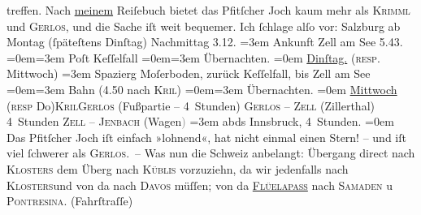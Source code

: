 \begin{ledgroupsized}[t]{13cm}
               treffen.\pend
           \pstart
           Nach \uline{meinem} Reiſebuch bietet das Pfitſcher Joch kaum mehr als \textsc{Krimml} und \textsc{Gerlos}, und die Sache iſt weit bequemer.\pend
           \pstart
           Ich ſchlage alſo vor:\pend
           \pstart
           Salzburg ab Montag (ſpäteſtens
                  Dinſtag) Nachmittag 3.12.\pend
           \leftskip=3em{}\pstart
           \noindent{}{\pb}Ankunft Zell am See{ }5.43.\pend
           \leftskip=0em{}\leftskip=3em{}\pstart
           Poſt Keſſelfall\pend
           \leftskip=0em{}\leftskip=3em{}\pstart
           Übernachten.\pend
           \leftskip=0em{}\pstart
           \noindent{}\uline{Dinſtag.} (\textsc{resp}. Mittwoch)\pend
           \leftskip=3em{}\pstart
           \noindent{}Spazierg Moſerboden, zurück Keſſelfall, bis Zell
                  am See\pend
           \leftskip=0em{}\leftskip=3em{}\pstart
           Bahn (4.50 nach \textsc{Kri{\geminationm}l})\pend
           \leftskip=0em{}\leftskip=3em{}\pstart
           Übernachten.\pend
           \leftskip=0em{}\pstart
           \noindent{}\uline{Mittwoch}{ }\introOben{}(\textsc{resp}{ }Do{\geminationn})\introOben{}{ }\textsc{Kri{\geminationm}l}\textsc{Gerlos} (Fußpartie – 4 Stunden)\pend
           \pstart
           \textsc{Gerlos} – \textsc{Zell} (Zillerthal) 4 Stunden\pend
           \pstart
           \textsc{Zell – Jenbach} (Wagen\textcolor{gray}{)}\pend
           \leftskip=3em{}\pstart
           \noindent{}abds{ }Innsbruck, 4 Stunden.\pend
           \leftskip=0em{}\pstart
           \noindent{}{\pb}Das Pfitſcher
                  Joch iſt einfach »lohnend«, hat nicht einmal einen Stern! – und iſt
               viel ſchwerer als \textsc{Gerlos}. –\pend
           \pstart
           Was nun die Schweiz anbelangt: Übergang direct
               nach \textsc{Klosters} dem Überg nach \textsc{Küblis} vorzuziehn, da wir jedenfalls nach \textsc{Klosters}und von da nach \textsc{Davos} müſſen; von da \textsc{\uline{Flüelapass}} nach \textsc{Samaden} u \textsc{Pontresina}. (Fahrſtraſſe)\pend

\end{ledgroupsized}
